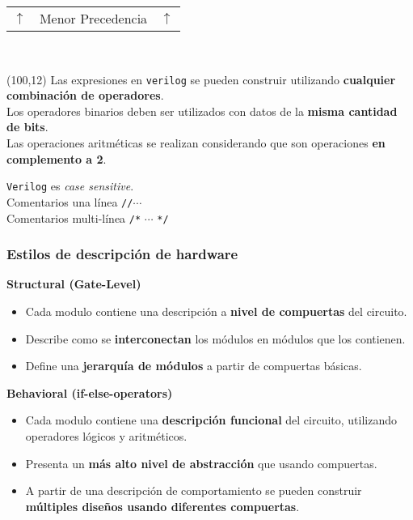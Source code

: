 \documentclass[aspectratio=169]{beamer}
\begin{document}
\begin{frame}[fragile,t]
\begin{textblock}{80}
\begin{center}
    \vspace{0.2cm}
    \begin{tabular}{C{1cm}C{5cm}C{1cm}} \hline  $\uparrow$ & Menor Precedencia & $\uparrow$ \\ \end{tabular}\\
    \end{center}
    \end{textblock}
    \begin{textblock}{52}(100,12)
    Las expresiones en \texttt{verilog} se pueden construir utilizando \textbf{cualquier combinación de operadores}.\\
    \bigskip
    Los operadores binarios deben ser utilizados con datos de la \textbf{misma cantidad de bits}.\\
    \bigskip
    Las operaciones aritméticas se realizan considerando que son operaciones \textbf{en complemento a 2}.
    \begin{block}{\vspace*{-3ex}}
    \footnotesize
    \texttt{Verilog} es \emph{case sensitive}.\\
    Comentarios una línea \verb|//|$\cdots$\\
    Comentarios multi-línea \verb|/*| $\cdots$ \verb|*/|
    \end{block}
    \end{textblock}
\end{frame}

\begin{frame}[fragile]
    \frametitle{Estilos de descripción de hardware}
    \textcolor{naranjauca}{\textbf{Structural (Gate-Level)}}
    \begin{itemize}
    \item<2-> Cada modulo contiene una descripción a \textbf{nivel de compuertas} del circuito.
    \item<3-> Describe como se \textbf{interconectan} los módulos en módulos que los contienen.
    \item<4-> Define una \textbf{jerarquía de módulos} a partir de compuertas básicas.
    \end{itemize}
    \bigskip
    \textcolor{naranjauca}{\textbf{Behavioral (if-else-operators)}}
    \begin{itemize}
    \item<5-> Cada modulo contiene una \textbf{descripción funcional} del circuito, utilizando operadores lógicos y aritméticos.
    \item<6-> Presenta un \textbf{más alto nivel de abstracción} que usando compuertas.
    \item<7-> A partir de una descripción de comportamiento se pueden construir \textbf{múltiples diseños usando diferentes compuertas}.
    \end{itemize}
    \bigskip
\end{frame}
\end{document}

